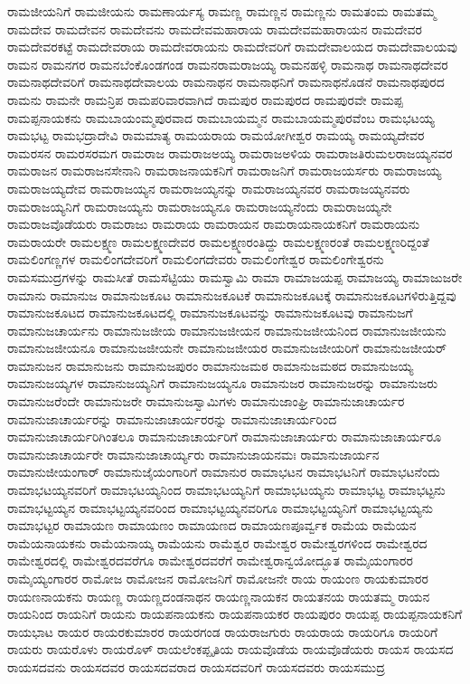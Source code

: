 {ರಾಮಜೀಯನಿಗೆ
ರಾಮಜೀಯನು
ರಾಮಣಾರ್ಯಸ್ಯ
ರಾಮಣ್ಣ
ರಾಮಣ್ಣನ
ರಾಮಣ್ಣನು
ರಾಮತಂಮ
ರಾಮತಮ್ಮ
ರಾಮದೇವ
ರಾಮದೇವನ
ರಾಮದೇವನು
ರಾಮದೇವಮಹಾರಾಯ
ರಾಮದೇವಮಹಾರಾಯನ
ರಾಮದೇವರ
ರಾಮದೇವರಕಟ್ಟೆ
ರಾಮದೇವರಾಯ
ರಾಮದೇವರಾಯನು
ರಾಮದೇವರಿಗೆ
ರಾಮದೇವಾಲಯದ
ರಾಮದೇವಾಲಯವು
ರಾಮನ
ರಾಮನಗರ
ರಾಮನಬೆಂಕೊಂಡಗಂಡ
ರಾಮನರಾಮರಾಜಯ್ಯ
ರಾಮನಹಳ್ಳಿ
ರಾಮನಾಥ
ರಾಮನಾಥದೇವರ
ರಾಮನಾಥದೇವರಿಗೆ
ರಾಮನಾಥದೇವಾಲಯ
ರಾಮನಾಥನ
ರಾಮನಾಥನಿಗೆ
ರಾಮನಾಥನೊಡನೆ
ರಾಮನಾಥಪುರದ
ರಾಮನು
ರಾಮನೇ
ರಾಮನ್ರಿಪ
ರಾಮಪರಿವಾರವಾಗಿದೆ
ರಾಮಪುರ
ರಾಮಪುರದ
ರಾಮಪುರವೇ
ರಾಮಪ್ಪ
ರಾಮಪ್ಪನಾಯಕನು
ರಾಮಬಾಯಂಮ್ಮಪುರವಾದ
ರಾಮಬಾಯಮ್ಮನ
ರಾಮಬಾಯಮ್ಮಪುರವೆಂಬ
ರಾಮಭಟಯ್ಯ
ರಾಮಭಟ್ಟ
ರಾಮಭದ್ರಾದೇವಿ
ರಾಮಮಾತ್ಯ
ರಾಮಯರಾಯ
ರಾಮಯೋಗೀಶ್ವರ
ರಾಮಯ್ಯ
ರಾಮಯ್ಯದೇವರ
ರಾಮರಸನ
ರಾಮರಸರಮಗ
ರಾಮರಾಜ
ರಾಮರಾಜಅಯ್ಯ
ರಾಮರಾಜಅಳಿಯ
ರಾಮರಾಜತಿರುಮಲರಾಜಯ್ಯನವರ
ರಾಮರಾಜನ
ರಾಮರಾಜನಸೇನಾನಿ
ರಾಮರಾಜನಾಯಕನಿಗೆ
ರಾಮರಾಜನಿಗೆ
ರಾಮರಾಜಯರ್ಸರು
ರಾಮರಾಜಯ್ಯ
ರಾಮರಾಜಯ್ಯದೇವ
ರಾಮರಾಜಯ್ಯನ
ರಾಮರಾಜಯ್ಯನನ್ನು
ರಾಮರಾಜಯ್ಯನವರ
ರಾಮರಾಜಯ್ಯನವರು
ರಾಮರಾಜಯ್ಯನಿಗೆ
ರಾಮರಾಜಯ್ಯನು
ರಾಮರಾಜಯ್ಯನೂ
ರಾಮರಾಜಯ್ಯನೆಂದು
ರಾಮರಾಜಯ್ಯನೇ
ರಾಮರಾಜವೊಡೆಯರು
ರಾಮರಾಜು
ರಾಮರಾಯ
ರಾಮರಾಯನ
ರಾಮರಾಯನಾಯಕನಿಗೆ
ರಾಮರಾಯನು
ರಾಮರಾಯರೇ
ರಾಮಲಕ್ಷ್ಮಣ
ರಾಮಲಕ್ಷ್ಮಣದೇವರ
ರಾಮಲಕ್ಷ್ಮಣರಂತಿದ್ದು
ರಾಮಲಕ್ಷ್ಮಣರಂತೆ
ರಾಮಲಕ್ಷ್ಮಣರಿದ್ದಂತೆ
ರಾಮಲಿಂಗಣ್ಣಗಳ
ರಾಮಲಿಂಗದೇವರಿಗೆ
ರಾಮಲಿಂಗದೇವರು
ರಾಮಲಿಂಗೇಶ್ವರ
ರಾಮಲಿಂಗೇಶ್ವರನು
ರಾಮಸಮುದ್ರಗಳನ್ನು
ರಾಮಸೀತೆ
ರಾಮಸೆಟ್ಟಿಯು
ರಾಮಸ್ವಾಮಿ
ರಾಮಾ
ರಾಮಾಜಯಪ್ಪ
ರಾಮಾಜಯ್ಯ
ರಾಮಾಜುಜರೇ
ರಾಮಾನು
ರಾಮಾನುಜ
ರಾಮಾನುಜಕೂಟ
ರಾಮಾನುಜಕೂಟಕೆ
ರಾಮಾನುಜಕೂಟಕ್ಕೆ
ರಾಮಾನುಜಕೂಟಗಳಿರುತ್ತಿದ್ದವು
ರಾಮಾನುಜಕೂಟದ
ರಾಮಾನುಜಕೂಟದಲ್ಲಿ
ರಾಮಾನುಜಕೂಟವನ್ನು
ರಾಮಾನುಜಕೂಟವು
ರಾಮಾನುಜಗೆ
ರಾಮಾನುಜಚಾರ್ಯನು
ರಾಮಾನುಜಜೀಯ
ರಾಮಾನುಜಜೀಯನ
ರಾಮಾನುಜಜೀಯನಿಂದ
ರಾಮಾನುಜಜೀಯನು
ರಾಮಾನುಜಜೀಯನೂ
ರಾಮಾನುಜಜೀಯನೇ
ರಾಮಾನುಜಜೀಯರ
ರಾಮಾನುಜಜೀಯರಿಗೆ
ರಾಮಾನುಜಜೀಯರ್
ರಾಮಾನುಜನ
ರಾಮಾನುಜನು
ರಾಮಾನುಜಪುರಂ
ರಾಮಾನುಜಮಠ
ರಾಮಾನುಜಮಠದ
ರಾಮಾನುಜಯ್ಯ
ರಾಮಾನುಜಯ್ಯಗಳ
ರಾಮಾನುಜಯ್ಯನಿಗೆ
ರಾಮಾನುಜಯ್ಯನೂ
ರಾಮಾನುಜರ
ರಾಮಾನುಜರನ್ನು
ರಾಮಾನುಜರು
ರಾಮಾನುಜರೆಂದೇ
ರಾಮಾನುಜರೇ
ರಾಮಾನುಜಸ್ವಾಮಿಗಳು
ರಾಮಾನುಜಾಂಘ್ರಿ
ರಾಮಾನುಜಾಚಾರ್ಯರ
ರಾಮಾನುಜಾಚಾರ್ಯರನ್ನು
ರಾಮಾನುಜಾಚಾರ್ಯರರನ್ನು
ರಾಮಾನುಜಾಚಾರ್ಯರಿಂದ
ರಾಮಾನುಜಾಚಾರ್ಯರಿಗಿಂತಲೂ
ರಾಮಾನುಜಾಚಾರ್ಯರಿಗೆ
ರಾಮಾನುಜಾಚಾರ್ಯರು
ರಾಮಾನುಜಾಚಾರ್ಯರೂ
ರಾಮಾನುಜಾಚಾರ್ಯರೇ
ರಾಮಾನುಜಾಚಾರ್ಯ್ಯರು
ರಾಮಾನುಜಾಯನಮಃ
ರಾಮಾನುಜಾರ್ಯನ
ರಾಮಾನುಜೀಯಂಗಾರ್
ರಾಮಾನುಜೈಯಂಗಾರಿಗೆ
ರಾಮಾನುರ
ರಾಮಾಭಟನ
ರಾಮಾಭಟನಿಗೆ
ರಾಮಾಭಟನೆಂದು
ರಾಮಾಭಟಯ್ಯನವರಿಗೆ
ರಾಮಾಭಟಯ್ಯನಿಂದ
ರಾಮಾಭಟಯ್ಯನಿಗೆ
ರಾಮಾಭಟಯ್ಯನು
ರಾಮಾಭಟ್ಟ
ರಾಮಾಭಟ್ಟನು
ರಾಮಾಭಟ್ಟಯ್ಯನ
ರಾಮಾಭಟ್ಟಯ್ಯನವರಿಂದ
ರಾಮಾಭಟ್ಟಯ್ಯನವರಿಗೂ
ರಾಮಾಭಟ್ಟಯ್ಯನಿಗೆ
ರಾಮಾಭಟ್ಟಯ್ಯನು
ರಾಮಾಭಟ್ಟರ
ರಾಮಾಯಣ
ರಾಮಾಯಣಂ
ರಾಮಾಯಣದ
ರಾಮಾಯಣಪೂರ್ವ್ವಕ
ರಾಮೆಯ
ರಾಮೆಯನ
ರಾಮೆಯನಾಯಕನು
ರಾಮೆಯನಾಯ್ಕ
ರಾಮೆಯನು
ರಾಮೆಶ್ವರ
ರಾಮೇಶ್ವರ
ರಾಮೇಶ್ವರಗಳಿಂದ
ರಾಮೇಶ್ವರದ
ರಾಮೇಶ್ವರದಲ್ಲಿ
ರಾಮೇಶ್ವರದವರೆಗೂ
ರಾಮೇಶ್ವರದವರೆಗೆ
ರಾಮೇಶ್ವರಾನ್ವಯೋದ್ಭೂತ
ರಾಮೈಯಂಗಾರರ
ರಾಮೈಯ್ಯಂಗಾರರ
ರಾಮೋಜ
ರಾಮೋಜನ
ರಾಮೋಜನಿಗೆ
ರಾಮೋಜನೇ
ರಾಯ
ರಾಯಂಣ
ರಾಯಕುಮಾರರ
ರಾಯಣನಾಯಕನು
ರಾಯಣ್ಣ
ರಾಯಣ್ಣದಂಡನಾಥನ
ರಾಯಣ್ಣನಾಯಕನ
ರಾಯತನಯ
ರಾಯತಮ್ಮ
ರಾಯನ
ರಾಯನಿಂದ
ರಾಯನಿಗೆ
ರಾಯನು
ರಾಯಪನಾಯಕನು
ರಾಯಪನಾಯಕರ
ರಾಯಪುರಂ
ರಾಯಪ್ಪ
ರಾಯಪ್ಪನಾಯಕನಿಗೆ
ರಾಯಭಾಟ
ರಾಯರ
ರಾಯರಕುಮಾರರ
ರಾಯರಗಂಡ
ರಾಯರಾಜಗುರು
ರಾಯರಾಯ
ರಾಯರಿಗೂ
ರಾಯರಿಗೆ
ರಾಯರು
ರಾಯರೊಳು
ರಾಯರೊಳ್
ರಾಯಲೆಂಕಪ್ಪೃತಿಯ
ರಾಯವೊಡೆಯ
ರಾಯವೊಡೆಯರು
ರಾಯಸ
ರಾಯಸದ
ರಾಯಸದವನು
ರಾಯಸದವರ
ರಾಯಸದವರಾದ
ರಾಯಸದವರಿಗೆ
ರಾಯಸದವರು
ರಾಯಸಮುದ್ರ
}
